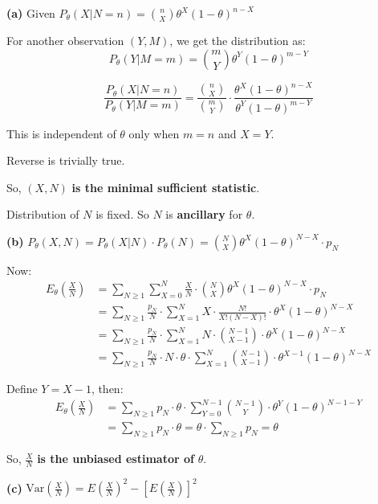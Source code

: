 \documentclass[12pt,a4paper,onecolumn]{exam}
\begin{document}
\begin{solution}
\textbf{(a)} Given $P_{\theta}(X | N = n) = \binom{n}{X} \theta^X (1-\theta)^{n-X}$

For another observation $(Y, M)$, we get the distribution as:
\[
P_{\theta}(Y | M = m) = \binom{m}{Y} \theta^Y (1-\theta)^{m-Y}
\]

\[
\frac{P_{\theta}(X | N = n)}{P_{\theta}(Y | M = m)} = \frac{\binom{n}{X}}{\binom{m}{Y}} \cdot \frac{\theta^X (1-\theta)^{n-X}}{\theta^Y (1-\theta)^{m-Y}}
\]

This is independent of $\theta$ only when $m = n$ and $X = Y$.

Reverse is trivially true.

So, $\boxed{(X, N)}$ \textbf{is the minimal sufficient statistic}.

Distribution of $N$ is fixed. So $N$ is \textbf{ancillary} for $\theta$.

\vspace{1em}
\textbf{(b)} $P_{\theta}(X, N) = P_{\theta}(X|N) \cdot P_{\theta}(N) = \binom{N}{X} \theta^X (1-\theta)^{N-X} \cdot p_N$

Now:
\begin{align*}
E_{\theta}\left(\frac{X}{N}\right) &= \sum_{N \geq 1} \sum_{X=0}^{N} \frac{X}{N} \cdot \binom{N}{X} \theta^X (1-\theta)^{N-X} \cdot p_N \\
&= \sum_{N \geq 1} \frac{p_N}{N} \cdot \sum_{X=1}^{N} X \cdot \frac{N!}{X!(N-X)!} \cdot \theta^X (1-\theta)^{N-X} \\
&= \sum_{N \geq 1} \frac{p_N}{N} \cdot \sum_{X=1}^{N} N \cdot \binom{N-1}{X-1} \cdot \theta^X (1-\theta)^{N-X} \\
&= \sum_{N \geq 1} \frac{p_N}{N} \cdot N \cdot \theta \cdot \sum_{X=1}^{N} \binom{N-1}{X-1} \cdot \theta^{X-1} (1-\theta)^{N-X}
\end{align*}

Define $Y = X - 1$, then:
\begin{align*}
E_{\theta}\left(\frac{X}{N}\right) &= \sum_{N \geq 1} p_N \cdot \theta \cdot \sum_{Y=0}^{N-1} \binom{N-1}{Y} \cdot \theta^Y (1-\theta)^{N-1-Y} \\
&= \sum_{N \geq 1} p_N \cdot \theta = \theta \cdot \sum_{N \geq 1} p_N = \theta
\end{align*}

So, $\boxed{\frac{X}{N}}$ \textbf{is the unbiased estimator of} $\theta$.

\vspace{1em}
\textbf{(c)} $\text{Var}\left(\frac{X}{N}\right) = E\left(\frac{X}{N}\right)^2 - \left[E\left(\frac{X}{N}\right)\right]^2$


\end{solution}
\end{document}
